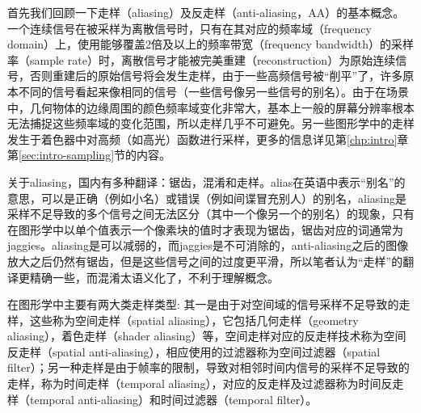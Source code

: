 首先我们回顾一下走样（aliasing）及反走样（anti-aliasing，AA）的基本概念。一个连续信号在被采样为离散信号时，只有在其对应的频率域（frequency domain）上，使用能够覆盖2倍及以上的频率带宽（frequency bandwidth）的采样率（sample rate）时，离散信号才能被完美重建（reconstruction）为原始连续信号，否则重建后的原始信号将会发生走样，由于一些高频信号被“削平”了，许多原本不同的信号看起来像相同的信号（一些信号像另一些信号的别名）。由于在场景中，几何物体的边缘周围的颜色频率域变化非常大，基本上一般的屏幕分辨率根本无法捕捉这些频率域的变化范围，所以走样几乎不可避免。另一些图形学中的走样发生于着色器中对高频（如高光）函数进行采样，更多的信息详见第\ref{chp:intro}章第\ref{sec:intro-sampling}节的内容。

\begin{shaded*}
	关于aliasing，国内有多种翻译：锯齿，混淆和走样。alias在英语中表示“别名”的意思，可以是正确（例如小名）或错误（例如间谍冒充别人）的别名，aliasing是采样不足导致的多个信号之间无法区分（其中一个像另一个的别名）的现象，只有在图形学中以单个值表示一个像素块的值时才表现为锯齿，锯齿对应的词通常为jaggies。aliasing是可以减弱的，而jaggies是不可消除的，anti-aliasing之后的图像放大之后仍然有锯齿，但是这些信号之间的过度更平滑，所以笔者认为“走样”的翻译更精确一些，而混淆太语义化了，不利于理解概念。
\end{shaded*}

在图形学中主要有两大类走样类型: 其一是由于对空间域的信号采样不足导致的走样，这些称为空间走样（spatial aliasing），它包括几何走样（geometry aliasing），着色走样（shader aliasing）等，空间走样对应的反走样技术称为空间反走样（spatial anti-aliasing），相应使用的过滤器称为空间过滤器（spatial filter）；另一种走样是由于帧率的限制，导致对相邻时间内信号的采样不足导致的走样，称为时间走样（temporal aliasing），对应的反走样及过滤器称为时间反走样（temporal anti-aliasing）和时间过滤器（temporal filter）。

